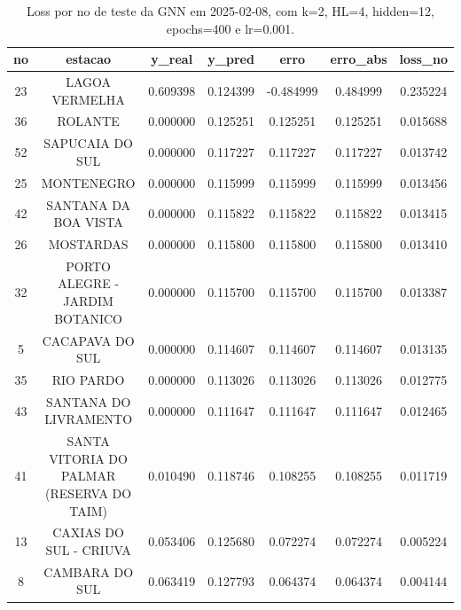 \begin{table}[h]
\centering
\caption{Loss por no de teste da GNN em 2025-02-08, com k=2, HL=4, hidden=12, epochs=400 e lr=0.001.}
\label{tab:gnn_loss_k2_hl4_h12_e400_d20250208}
\begin{tabular}{ccccccc}
\toprule
no & estacao & y\_real & y\_pred & erro & erro\_abs & loss\_no \\
\midrule
23 & LAGOA VERMELHA & 0.609398 & 0.124399 & -0.484999 & 0.484999 & 0.235224 \\
36 & ROLANTE & 0.000000 & 0.125251 & 0.125251 & 0.125251 & 0.015688 \\
52 & SAPUCAIA DO SUL & 0.000000 & 0.117227 & 0.117227 & 0.117227 & 0.013742 \\
25 & MONTENEGRO & 0.000000 & 0.115999 & 0.115999 & 0.115999 & 0.013456 \\
42 & SANTANA DA BOA VISTA & 0.000000 & 0.115822 & 0.115822 & 0.115822 & 0.013415 \\
26 & MOSTARDAS & 0.000000 & 0.115800 & 0.115800 & 0.115800 & 0.013410 \\
32 & PORTO ALEGRE - JARDIM BOTANICO & 0.000000 & 0.115700 & 0.115700 & 0.115700 & 0.013387 \\
5 & CACAPAVA DO SUL & 0.000000 & 0.114607 & 0.114607 & 0.114607 & 0.013135 \\
35 & RIO PARDO & 0.000000 & 0.113026 & 0.113026 & 0.113026 & 0.012775 \\
43 & SANTANA DO LIVRAMENTO & 0.000000 & 0.111647 & 0.111647 & 0.111647 & 0.012465 \\
41 & SANTA VITORIA DO PALMAR (RESERVA DO TAIM) & 0.010490 & 0.118746 & 0.108255 & 0.108255 & 0.011719 \\
13 & CAXIAS DO SUL - CRIUVA & 0.053406 & 0.125680 & 0.072274 & 0.072274 & 0.005224 \\
8 & CAMBARA DO SUL & 0.063419 & 0.127793 & 0.064374 & 0.064374 & 0.004144 \\
\bottomrule
\end{tabular}
\end{table}
